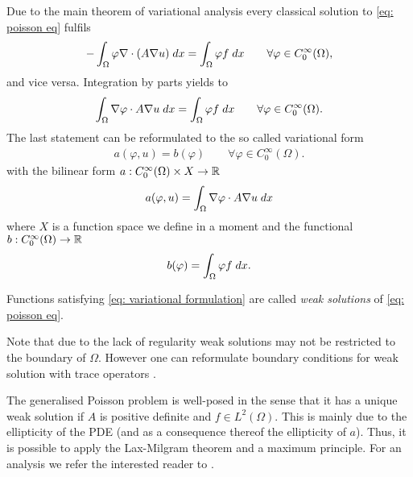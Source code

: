 Due to the main theorem of variational analysis every classical solution to \eqref{eq: poisson eq} fulfils 
\begin{align}
	-\int_{\Omega} {{\varphi \nabla \cdot (A \nabla u)}\;dx}=
	 \int_{\Omega} {{\varphi f}\;dx} \qquad \forall \varphi \in C_0^\infty(\Omega), \label{eq: variational form}
\end{align}
and vice versa.
Integration by parts yields to
\begin{align*}
	\myIntX \Omega {\nabla \varphi  \cdot A\nabla u}
	= \myIntX  \Omega { \varphi f } \qquad \forall \varphi \in C_0^\infty(\Omega). %
\end{align*}
The last statement can be reformulated to the so called variational form 
\begin{align}
a(\varphi,u)  = b(\varphi) \qquad \forall \varphi \in C_0^\infty(\Omega). \label{eq: variational formulation}
\end{align}
with the bilinear form $a:C_0^\infty(\Omega) \times X \rightarrow \mathbb{R}$
\begin{align*}
a(\varphi,u) = \int_{\Omega} {{ \nabla \varphi  \cdot A\nabla u }\;dx}
\end{align*}
where $X$ is a function space we define in a moment and the functional $b:C_0^\infty(\Omega) \rightarrow \mathbb{R}$
\begin{align*}
 b(\varphi)  = \int_{\Omega} {{ \varphi f}\;dx}.
\end{align*}


\begin{definition}
	Functions satisfying \eqref{eq: variational formulation} are called \emph{weak solutions} of \eqref{eq: poisson eq}.
\end{definition}
Note that due to the lack of regularity weak solutions may not be restricted to the boundary of $\Omega$. However one can reformulate boundary conditions for weak solution with trace operators \cite[Section 5.5]{Evans1998}.

The generalised Poisson problem is well-posed in the sense that it has a unique weak solution if $A$ is positive definite and $f\in L^2(\Omega)$. This is mainly due to the ellipticity of the PDE (and as a consequence thereof the ellipticity of $a$). Thus, it is possible to apply the Lax-Milgram theorem and a maximum principle. For an analysis we refer the interested reader to \cite[Chapter~6]{Evans1998}.

